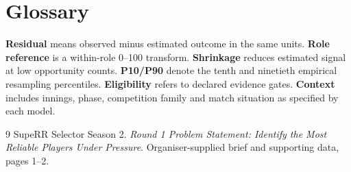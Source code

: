 \documentclass[12pt,a4paper]{article}
\begin{document}
\section{Glossary}
\textbf{Residual} means observed minus estimated outcome in the same units. \textbf{Role reference} is a within-role 0--100 transform. \textbf{Shrinkage} reduces estimated signal at low opportunity counts. \textbf{P10/P90} denote the tenth and ninetieth empirical resampling percentiles. \textbf{Eligibility} refers to declared evidence gates. \textbf{Context} includes innings, phase, competition family and match situation as specified by each model.

\begin{thebibliography}{9}
 SupeRR Selector Season 2. \emph{Round 1 Problem Statement: Identify the Most Reliable Players Under Pressure}. Organiser-supplied brief and supporting data, pages 1--2.
\end{thebibliography}
\clearpage
\appendix

\end{document}
